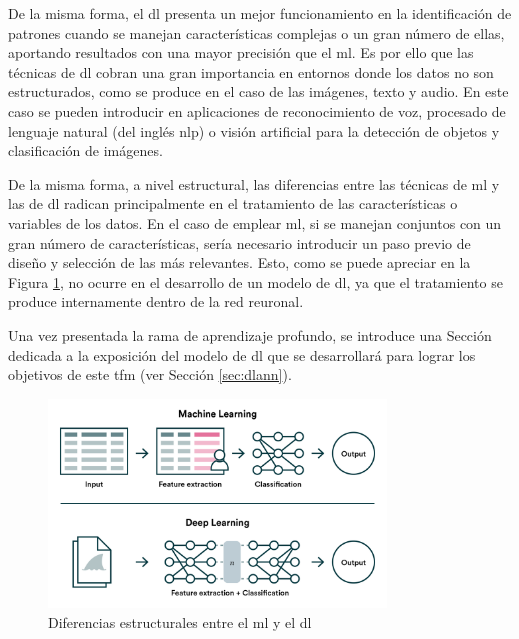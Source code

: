 \vspace{3mm}

De la misma forma, el \gls{dl} presenta un mejor funcionamiento en la identificación de patrones cuando se manejan características complejas o un gran número de ellas, aportando resultados con una mayor precisión que el \gls{ml}. Es por ello que las técnicas de \gls{dl} cobran una gran importancia en entornos donde los datos no son estructurados, como se produce en el caso de las imágenes, texto y audio. En este caso se pueden introducir en aplicaciones de reconocimiento de voz, procesado de lenguaje natural (del inglés \gls{nlp}) o visión artificial para la detección de objetos y clasificación de imágenes. \cite{iageeks}

\vspace{3mm}

De la misma forma, a nivel estructural, las diferencias entre las técnicas de \gls{ml} y las de \gls{dl} radican principalmente en el tratamiento de las características o variables de los datos. En el caso de emplear \gls{ml}, si se manejan conjuntos con un gran número de características, sería necesario introducir un paso previo de diseño y selección de las más relevantes. Esto, como se puede apreciar en la Figura \ref{fig:features}, no ocurre en el desarrollo de un modelo de \gls{dl}, ya que el tratamiento se produce internamente dentro de la red reuronal. \cite{valohai}

\vspace{3mm}

Una vez presentada la rama de aprendizaje profundo, se introduce una Sección dedicada a la exposición del modelo de \gls{dl} que se desarrollará para lograr los objetivos de este \gls{tfm} (ver Sección \ref{sec:dlann}). 

\vspace{3mm}

\begin{figure}[h!]
    \centering
    \includegraphics[width=0.8\textwidth]{img/teoria/mlvsdl.png}
    \caption{Diferencias estructurales entre el \acrshort{ml} y el \acrshort{dl} \cite{valohai}}
    \label{fig:features}
\end{figure}

